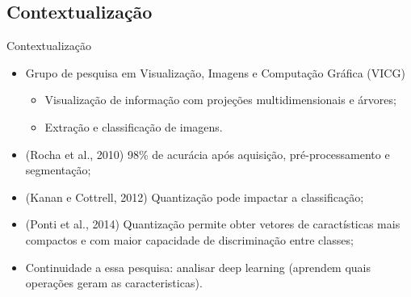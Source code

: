 \documentclass{beamer}
\begin{document}
\subsection{Contextualização}
\begin{frame}{Contextualização}
  \begin{itemize}
    \item Grupo de pesquisa em Visualização, Imagens e Computação Gráfica (VICG)
    \begin{itemize}
        \item Visualização de informação com projeções multidimensionais e árvores;
        \item Extração e classificação de imagens.
    \end{itemize}
    \item (Rocha et al., 2010) 98\% de acurácia após aquisição, pré-processamento e segmentação; %
    \item (Kanan e Cottrell, 2012) Quantização pode impactar a classificação;
    \item (Ponti et al., 2014) Quantização permite obter vetores de caractísticas mais compactos e com maior capacidade de discriminação entre classes;
    \item Continuidade a essa pesquisa: analisar deep learning (aprendem quais operações geram as caracteristicas).
  \end{itemize}
\end{frame}
\end{document}

